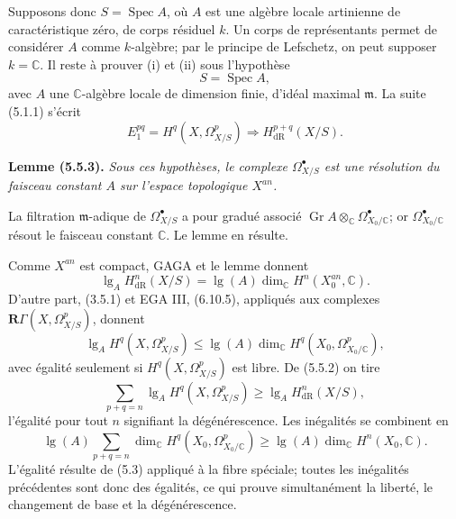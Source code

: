 \documentclass[11pt]{article}
\DeclareMathOperator{\Spec}{Spec}
\newcommand{\bR}{\mathbf R}
\newcommand{\C}{\mathbb C}
\newcommand{\length}{\operatorname{lg}}
\newenvironment{named}[1]{\par\medskip\noindent\textbf{#1}\itshape}{\par\medskip}
\begin{document}
Supposons donc $S=\Spec A$, où $A$ est une algèbre locale artinienne de caractéristique zéro, de corps résiduel $k$. Un corps de représentants permet de considérer $A$ comme $k$-algèbre; par le principe de Lefschetz, on peut supposer $k=\C$. Il reste à prouver (i) et (ii) sous l'hypothèse
\begin{equation}\tag{5.5.1}
S=\Spec A,
\end{equation}
avec $A$ une $\C$-algèbre locale de dimension finie, d'idéal maximal $\mathfrak m$. La suite (5.1.1) s'écrit
\begin{equation}\tag{5.5.2}
E_1^{pq}=H^q(X,\Omega^p_{X/S})\Longrightarrow H^{p+q}_{\mathrm{dR}}(X/S).
\end{equation}

\begin{named}{Lemme (5.5.3).}
Sous ces hypothèses, le complexe $\Omega^\bullet_{X/S}$ est une résolution du faisceau constant $A$ sur l'espace topologique $X^{an}$.
\end{named}
La filtration $\mathfrak m$-adique de $\Omega^\bullet_{X/S}$ a pour gradué associé $\operatorname{Gr}A\otimes_\C\Omega^\bullet_{X_0/\C}$; or $\Omega^\bullet_{X_0/\C}$ résout le faisceau constant $\C$. Le lemme en résulte.

Comme $X^{an}$ est compact, GAGA et le lemme donnent
\begin{equation}\tag{5.5.4}
\length_AH^n_{\mathrm{dR}}(X/S)=\length(A)\dim_\C H^n(X_0^{an},\C).
\end{equation}
D'autre part, (3.5.1) et EGA III, (6.10.5), appliqués aux complexes $\bR\Gamma(X,\Omega^p_{X/S})$, donnent
\begin{equation}\tag{5.5.5}
\length_AH^q(X,\Omega^p_{X/S})\le \length(A)\dim_\C H^q(X_0,\Omega^p_{X_0/\C}),
\end{equation}
avec égalité seulement si $H^q(X,\Omega^p_{X/S})$ est libre. De (5.5.2) on tire
\begin{equation}\tag{5.5.6}
\sum_{p+q=n}\length_AH^q(X,\Omega^p_{X/S})\ge \length_AH^n_{\mathrm{dR}}(X/S),
\end{equation}
l'égalité pour tout $n$ signifiant la dégénérescence. Les inégalités se combinent en
\begin{equation}\tag{5.5.7}
\length(A)\sum_{p+q=n}\dim_\C H^q(X_0,\Omega^p_{X_0/\C})\ge \length(A)\dim_\C H^n(X_0,\C).
\end{equation}
L'égalité résulte de (5.3) appliqué à la fibre spéciale; toutes les inégalités précédentes sont donc des égalités, ce qui prouve simultanément la liberté, le changement de base et la dégénérescence.
\end{document}
